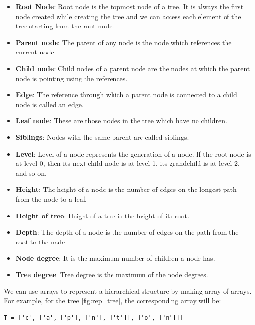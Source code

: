 \documentclass[a4paper,11pt]{book}
\begin{document}
\begin{itemize}
\item \textbf{Root Node}: Root node is the topmost node of a tree. It is always the first node created while creating the tree and we can access each element of the tree starting from the root node.

\item \textbf{Parent node}: The parent of any node is the node which references the current node. 

\item \textbf{Child node}: Child nodes of a parent node are the nodes at which the parent node is pointing using the references.

\item \textbf{Edge}: The reference through which a parent node is connected to a child node is called an edge.

\item \textbf{Leaf node}: These are those nodes in the tree which have no children.

\item \textbf{Siblings}: Nodes with the same parent are called siblings.

\item \textbf{Level}: Level of a node represents the generation of a node. If the root node is at level 0, then its next child node is at level 1, its grandchild is at level 2, and so on.

\item \textbf{Height}: The height of a node is the number of edges on the longest path from the node to a leaf.

\item \textbf{Height of tree}: Height of a tree is the height of its root.

\item \textbf{Depth}: The depth of a node is the number of edges on the path from the root to the node.

\item \textbf{Node degree}: It is the maximum number of children a node has.

\item \textbf{Tree degree}: Tree degree is the maximum of the node degrees.
\end{itemize}

\noindent We can use arrays to represent a hierarchical structure by making array of arrays. For example, for the tree \ref{fig:rep_tree}, the corresponding array will be:
\begin{lstlisting}
T = ['c', ['a', ['p'], ['n'], ['t']], ['o', ['n']]]
\end{lstlisting}
\end{document}
